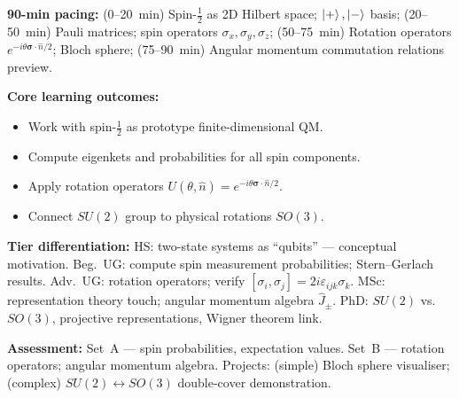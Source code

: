 \documentclass[11pt,a4paper]{article}
\begin{document}
\medskip
\begin{tcolorbox}[modulebox, title={Module~I.2 / L10: Spin \& Finite-Dimensional Hilbert Spaces ($SU(2)$)}]
\textbf{90-min pacing:} (0--20~min) Spin-$\tfrac{1}{2}$ as 2D Hilbert space; $\ket{+},\ket{-}$ basis;
(20--50~min) Pauli matrices; spin operators $\sigma_x,\sigma_y,\sigma_z$;
(50--75~min) Rotation operators $e^{-i\theta\boldsymbol{\sigma}\cdot\hat{n}/2}$; Bloch sphere;
(75--90~min) Angular momentum commutation relations preview.

\medskip\textbf{Core learning outcomes:}
\begin{itemize}[leftmargin=1.4em,topsep=2pt,itemsep=1pt]
  \item Work with spin-$\tfrac{1}{2}$ as prototype finite-dimensional QM.
  \item Compute eigenkets and probabilities for all spin components.
  \item Apply rotation operators $U(\theta,\hat{n})=e^{-i\theta\boldsymbol{\sigma}\cdot\hat{n}/2}$.
  \item Connect $SU(2)$ group to physical rotations $SO(3)$.
\end{itemize}

\medskip\textbf{Tier differentiation:}
HS: two-state systems as ``qubits'' --- conceptual motivation.
Beg.\ UG: compute spin measurement probabilities; Stern--Gerlach results.
Adv.\ UG: rotation operators; verify $[\sigma_i,\sigma_j]=2i\varepsilon_{ijk}\sigma_k$.
MSc: representation theory touch; angular momentum algebra $\hat{J}_\pm$.
PhD: $SU(2)$ vs.\ $SO(3)$, projective representations, Wigner theorem link.

\medskip\textbf{Assessment:}
Set~A --- spin probabilities, expectation values.
Set~B --- rotation operators; angular momentum algebra.
Projects: (simple) Bloch sphere visualiser; (complex) $SU(2)\leftrightarrow SO(3)$ double-cover demonstration.
\end{tcolorbox}
\end{document}
